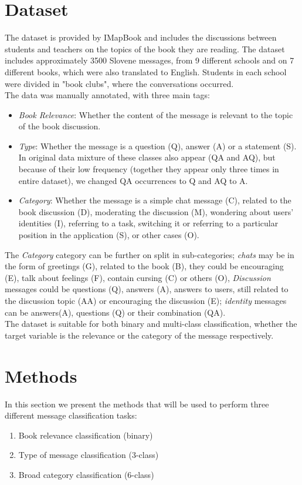 \documentclass[11pt,a4paper]{article}
\begin{document}
\section{Dataset}
\label{dataset}
The dataset is provided by IMapBook and includes the discussions between students and teachers on the topics of the book they are reading. The dataset includes approximately 3500 Slovene messages, from 9 different schools and on 7 different books, which were also translated to English. Students in each school were divided in "book clubs", where the conversations occurred.\\
The data was manually annotated, with three main tags:
\begin{itemize}
    \item \textit{Book Relevance}: Whether the content of the message is relevant to the topic of the book discussion.
    \item \textit{Type}: Whether the message is a question (Q), answer (A) or a statement (S). In original data mixture of these classes also appear (QA and AQ), but because of their low frequency (together they appear only three times in entire dataset), we changed QA occurrences to Q and AQ to A.
    \item \textit{Category}: Whether the message is a simple chat message (C), related to the book discussion (D), moderating the discussion (M), wondering about users' identities (I), referring to a task, switching it or referring to a particular position in the application (S), or other cases (O).
\end{itemize}
The \textit{Category} category can be further on split in sub-categories; \textit{chats} may be in the form of greetings (G), related to the book (B), they could be encouraging (E), talk about feelings (F), contain cursing (C) or others (O), \textit{Discussion} messages could be questions (Q), answers (A), answers to users, still related to the discussion topic (AA) or encouraging the discussion (E); \textit{identity} messages can be answers(A), questions (Q) or their combination (QA).\\
The dataset is suitable for both binary and multi-class classification, whether the target variable is the relevance or the category of the message respectively.\\

\section{Methods}
In this section we present the methods that will be used to perform three different message classification tasks:
\begin{enumerate}
    \item Book relevance classification (binary)
    \item Type of message classification (3-class)
    \item Broad category classification (6-class)
\end{enumerate}
\end{document}
